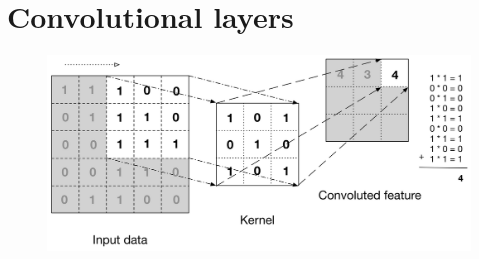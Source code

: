 \documentclass{book}
\begin{document}
\section{Convolutional layers}
\begin{figure}[H]
    \centering
    \includegraphics[width=1.0\linewidth]{images/cf.png}
    \label{fig:cf}
\end{figure}
\end{document}

